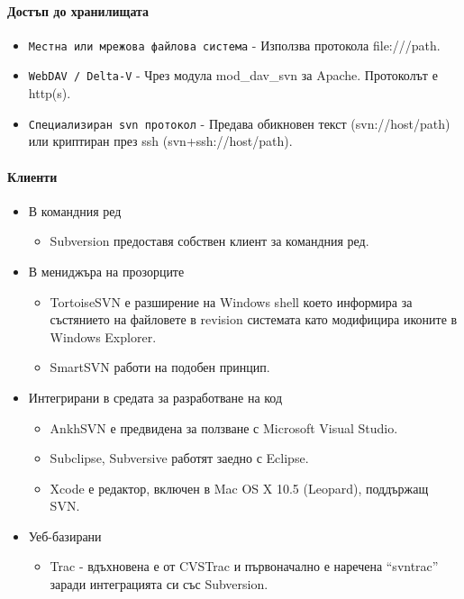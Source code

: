\documentclass[a4paper]{article}
\begin{document}
    \paragraph{Достъп до хранилищата}

    \begin{itemize}
      \item \texttt{Местна или мрежова файлова система} - Използва протокола file:///path.
      \item \texttt{WebDAV / Delta-V} - Чрез модула mod\_dav\_svn за Apache. Протоколът е http(s).
      \item \texttt{Специализиран svn протокол} - Предава обикновен текст (svn://host/path) или криптиран през ssh (svn+ssh://host/path).
    \end{itemize}

    \paragraph{Клиенти}

    \begin{itemize}
      \item В командния ред
        \begin{itemize}
          \item Subversion предоставя собствен клиент за командния ред.
        \end{itemize}
      \item В мениджъра на прозорците
        \begin{itemize}
          \item TortoiseSVN е разширение на Windows shell което информира за състянието на файловете в revision системата като модифицира иконите в Windows Explorer.
          \item SmartSVN работи на подобен принцип.
        \end{itemize}
      \item Интегрирани в средата за разработване на код
        \begin{itemize}
          \item AnkhSVN е предвидена за ползване с Microsoft Visual Studio.
          \item Subclipse, Subversive работят заедно с Eclipse.
          \item Xcode е редактор, включен в Mac OS X 10.5 (Leopard), поддържащ SVN.
        \end{itemize}
      \item Уеб-базирани
        \begin{itemize}
          \item Trac - вдъхновена е от CVSTrac и първоначално е наречена ``svntrac'' заради интеграцията си със Subversion.
        \end{itemize}
    \end{itemize}
\end{document}
